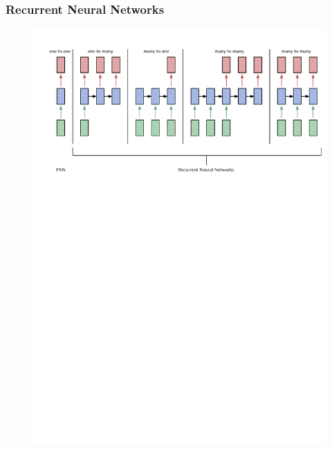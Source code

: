 \documentclass[aspectratio=169]{beamer}
\begin{document}
\begin{frame}
	\frametitle{Recurrent Neural Networks}
	\begin{figure}
		\includegraphics[width=\textwidth]{FNN-vs-RNN}
	\end{figure}
\end{frame}
\end{document}
